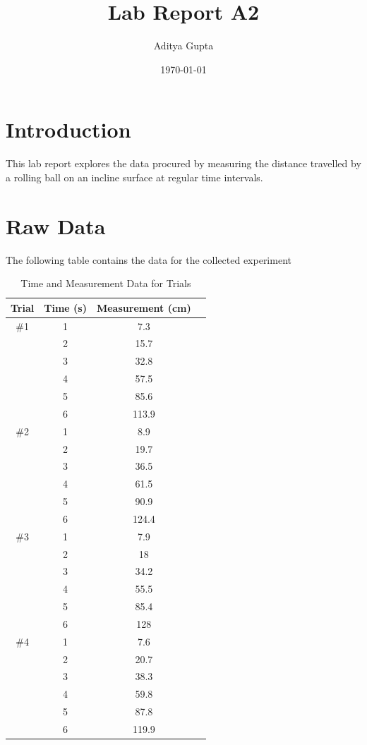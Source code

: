 \documentclass[12pt, letterpaper]{article}
\title{Lab Report A2}
\author{Aditya Gupta}
\date{\today}
\begin{document}
\maketitle
\newpage
\tableofcontents
\newpage
\section{Introduction}
This lab report explores the data procured by measuring the distance travelled by a rolling ball on an incline surface at regular time intervals.
\section{Raw Data}
The following table contains the data for the collected experiment
\begin{table}[h!]
\centering
\begin{tabular}{|c|c|c|c|}
\hline
\textbf{Trial} & \textbf{Time (s)} & \textbf{Measurement (cm)} \\
\hline
\#1 & 1 & 7.3 \\
    & 2 & 15.7 \\
    & 3 & 32.8 \\
    & 4 & 57.5 \\
    & 5 & 85.6 \\
    & 6 & 113.9 \\
\hline
\#2 & 1 & 8.9 \\
    & 2 & 19.7 \\
    & 3 & 36.5 \\
    & 4 & 61.5 \\
    & 5 & 90.9 \\
    & 6 & 124.4 \\
\hline
\#3 & 1 & 7.9 \\
    & 2 & 18 \\
    & 3 & 34.2 \\
    & 4 & 55.5 \\
    & 5 & 85.4 \\
    & 6 & 128 \\
\hline
\#4 & 1 & 7.6 \\
    & 2 & 20.7 \\
    & 3 & 38.3 \\
    & 4 & 59.8 \\
    & 5 & 87.8 \\
    & 6 & 119.9 \\
\hline
\end{tabular}
\caption{Time and Measurement Data for Trials}
\label{table:measurement_data}
\end{table}
\end{document}
